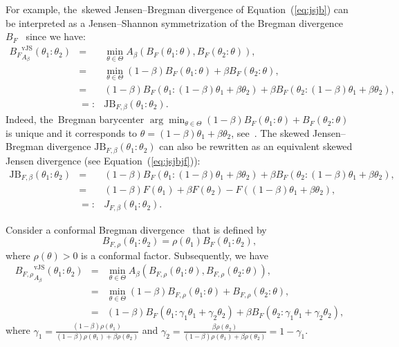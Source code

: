 \documentclass[entropy,article,accept,oneauthor,pdftex,entropy]{Definitions/mdpi}
\def\vJS{\mathrm{vJS}}
\begin{document}
\begin{paracol}{2}
\begin{Example}
For example, the~skewed Jensen--Bregman divergence of Equation~(\ref{eq:jsjb}) can be interpreted as a Jensen--Shannon symmetrization of the Bregman divergence $B_F$~\cite{BR-2011} since we have:
\begin{eqnarray}
{B_F}^\vJS_{A_\beta}(\theta_1:\theta_2) &=& \min_{\theta\in\Theta} A_\beta\left(B_F(\theta_1:\theta),B_F(\theta_2:\theta)\right),\\
&=& \min_{\theta\in\Theta} (1-\beta)B_F(\theta_1:\theta)+\beta B_F(\theta_2:\theta),\\
&=& (1-\beta)B_F(\theta_1:(1-\beta)\theta_1+\beta\theta_2)+\beta B_F(\theta_2:(1-\beta)\theta_1+\beta\theta_2),\\
&=:& \mathrm{JB}_{F,\beta}(\theta_1:\theta_2).
\end{eqnarray}
Indeed, the~Bregman barycenter $\arg\min_{\theta\in\Theta} (1-\beta)B_F(\theta_1:\theta)+B_F(\theta_2:\theta)$ is unique and it corresponds to
$\theta=(1-\beta)\theta_1+\beta\theta_2$, see~\cite{BregmanKmeans-2005}.
The  skewed Jensen--Bregman divergence $\mathrm{JB}_{F,\beta}(\theta_1:\theta_2)$ can also be rewritten as an equivalent skewed Jensen divergence (see Equation~(\ref{eq:jsjbjf})):
\begin{eqnarray}
\mathrm{JB}_{F,\beta}(\theta_1:\theta_2) &=& (1-\beta)B_F(\theta_1:(1-\beta)\theta_1+\beta\theta_2)+\beta B_F(\theta_2:(1-\beta)\theta_1+\beta\theta_2),\\
&=& (1-\beta)F(\theta_1)+\beta F(\theta_2)-F((1-\beta)\theta_1+\beta\theta_2),\\
&=:& J_{F,\beta}(\theta_1:\theta_2).
\end{eqnarray}
\end{Example}

\begin{Example}
Consider a conformal Bregman divergence~\cite{conformaldiv-2015} that is defined by
\begin{equation}
B_{F,\rho}(\theta_1:\theta_2)=\rho(\theta_1)B_F(\theta_1:\theta_2),
\end{equation}
where $\rho(\theta)>0$ is a conformal factor.
Subsequently, we have
\begin{eqnarray}
{B_{F,\rho}}^\vJS_{A_\beta}(\theta_1:\theta_2) &=& \min_{\theta\in\Theta} A_\beta\left(B_{F,\rho}(\theta_1:\theta),B_{F,\rho}(\theta_2:\theta)\right),\\
&=& \min_{\theta\in\Theta} (1-\beta)B_{F,\rho}(\theta_1:\theta)+B_{F,\rho}(\theta_2:\theta),\\
&=& (1-\beta)B_F(\theta_1:\gamma_1\theta_1+\gamma_2\theta_2)+\beta B_F(\theta_2:\gamma_1\theta_1+\gamma_2\theta_2),
\end{eqnarray}
where $\gamma_1=\frac{(1-\beta)\rho(\theta_1)}{(1-\beta)\rho(\theta_1)+\beta\rho(\theta_2)}$ and 
$\gamma_2=\frac{\beta\rho(\theta_2)}{(1-\beta)\rho(\theta_1)+\beta\rho(\theta_2)}=1-\gamma_1$.
\end{Example}


\end{paracol}
\end{document}
